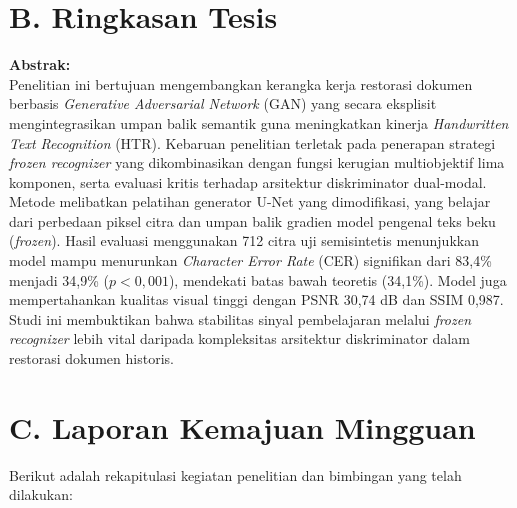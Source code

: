 \documentclass[a4paper,11pt]{article}
\begin{document}
\section*{B. Ringkasan Tesis}
\noindent \textbf{Abstrak:} \\
Penelitian ini bertujuan mengembangkan kerangka kerja restorasi dokumen berbasis \textit{Generative Adversarial Network} (GAN) yang secara eksplisit mengintegrasikan umpan balik semantik guna meningkatkan kinerja \textit{Handwritten Text Recognition} (HTR). Kebaruan penelitian terletak pada penerapan strategi \textit{frozen recognizer} yang dikombinasikan dengan fungsi kerugian multiobjektif lima komponen, serta evaluasi kritis terhadap arsitektur diskriminator dual-modal. Metode melibatkan pelatihan generator U-Net yang dimodifikasi, yang belajar dari perbedaan piksel citra dan umpan balik gradien model pengenal teks beku (\textit{frozen}). Hasil evaluasi menggunakan 712 citra uji semisintetis menunjukkan model mampu menurunkan \textit{Character Error Rate} (CER) signifikan dari 83,4\% menjadi 34,9\% ($p<0,001$), mendekati batas bawah teoretis (34,1\%). Model juga mempertahankan kualitas visual tinggi dengan PSNR 30,74 dB dan SSIM 0,987. Studi ini membuktikan bahwa stabilitas sinyal pembelajaran melalui \textit{frozen recognizer} lebih vital daripada kompleksitas arsitektur diskriminator dalam restorasi dokumen historis.

\section*{C. Laporan Kemajuan Mingguan}
Berikut adalah rekapitulasi kegiatan penelitian dan bimbingan yang telah dilakukan:
\end{document}
